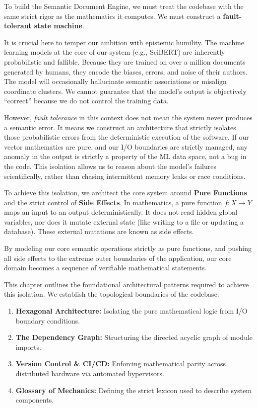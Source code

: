 To build the Semantic Document Engine, we must treat the codebase with the same strict rigor as the mathematics it computes. We must construct a \textbf{fault-tolerant state machine}.

It is crucial here to temper our ambition with epistemic humility. The machine learning models at the core of our system (e.g., SciBERT) are inherently probabilistic and fallible. Because they are trained on over a million documents generated by humans, they encode the biases, errors, and noise of their authors. The model will occasionally hallucinate semantic associations or misalign coordinate clusters. We cannot guarantee that the model's output is objectively ``correct'' because we do not control the training data.

However, \textit{fault tolerance} in this context does not mean the system never produces a semantic error. It means we construct an architecture that strictly isolates those probabilistic errors from the deterministic execution of the software. If our vector mathematics are pure, and our I/O boundaries are strictly managed, any anomaly in the output is strictly a property of the ML data space, not a bug in the code. This isolation allows us to reason about the model's failures scientifically, rather than chasing intermittent memory leaks or race conditions.

To achieve this isolation, we architect the core system around \textbf{Pure Functions} and the strict control of \textbf{Side Effects}. In mathematics, a pure function $f: X \to Y$ maps an input to an output deterministically. It does not read hidden global variables, nor does it mutate external state (like writing to a file or updating a database). These external mutations are known as side effects.

By modeling our core semantic operations strictly as pure functions, and pushing all side effects to the extreme outer boundaries of the application, our core domain becomes a sequence of verifiable mathematical statements.










This chapter outlines the foundational architectural patterns required to achieve this isolation. We establish the topological boundaries of the codebase:
\begin{enumerate}
    \item \textbf{Hexagonal Architecture:} Isolating the pure mathematical logic from I/O boundary conditions.
    \item \textbf{The Dependency Graph:} Structuring the directed acyclic graph of module imports.
    \item \textbf{Version Control \& CI/CD:} Enforcing mathematical parity across distributed hardware via automated hypervisors.
    \item \textbf{Glossary of Mechanics:} Defining the strict lexicon used to describe system components.
\end{enumerate}

